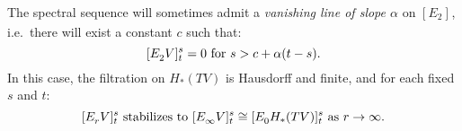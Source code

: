 \documentclass[11pt]{amsart} \renewcommand{\baselinestretch}{1.2}
\theoremstyle{plain}
\theoremstyle{definition}
\DeclareMathOperator{\Tot}{Tot}
\renewcommand{\to}{\longrightarrow}
\newcommand{\calT}{\mathcal{T}}
\newcommand{\calV}{\mathcal{V}}
\newcommand{\vect}[2]{\calV^{#1}_{#2}}
\newcommand{\Edownup}[5]{[E_{#1}^{#2}#3]^{#4}_{#5}}
\newcommand{\dhor}{_\mathrm{h}}
\begin{document}
\begin{Conventions and notation}
The spectral sequence will sometimes admit a \emph{vanishing line of slope $\alpha$} on $\Edownup{2}{}{}{}{}$, i.e.\ there will exist a constant $c$ such that:
\[\Edownup{2}{}{V}{s}{t}=0\textup{ for }s>c+\alpha(t-s).\]
In this case, the filtration on $H_*( TV)$ is Hausdorff and finite, and  for each fixed $s$ and $t$:
\[\Edownup{r}{}{V}{s}{t}\textup{ stabilizes to }\Edownup{\infty}{}{V}{s}{t}\cong \Edownup{0}{}{H_*( TV)}{s}{t}\textup{ as $r\rightarrow\infty$}.\]
%



\end{Conventions and notation}
\end{document}
